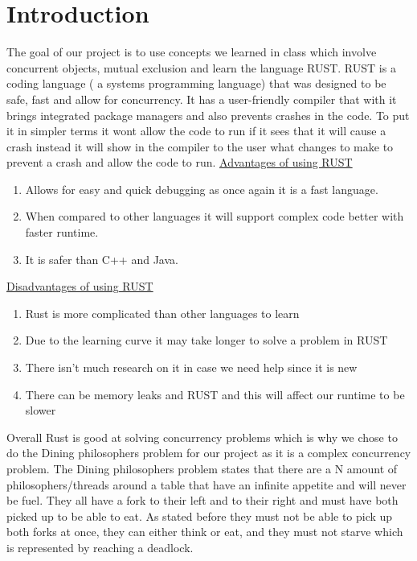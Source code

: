 \documentclass[conference]{IEEEtran}
\begin{document}
	\section{Introduction}
	 The goal of our project is to use concepts we learned in class which involve concurrent objects, mutual exclusion and learn the language RUST. RUST is a coding language ( a systems programming language) that was designed to be safe, fast and allow for concurrency.  It has a user-friendly compiler that with it brings integrated package managers and also prevents crashes in the code. To put it in simpler terms it wont allow the code to run if it sees that it will cause a crash instead it will show in the compiler to the user what changes to make to prevent a crash and allow the code to run. 
	 \linebreak
	 \underline{Advantages of using RUST}
	 \begin{enumerate}
	 	\item Allows for easy and quick debugging as once again it is a fast language.
	 	\item When compared to other languages it will support complex code better with faster runtime.
	 	\item It is safer than C++ and Java.
	 \end{enumerate}
	 \underline{Disadvantages of using RUST}
	 \begin{enumerate}
	 	\item Rust is more complicated than other languages to learn
	 	\item Due to the learning curve it may take longer to solve a problem in RUST
	 	\item There isn’t much research on it in case we need help since it is new
	 	\item There can be memory leaks and RUST and this will affect our runtime to be slower
	\end{enumerate}
	 Overall Rust is good at solving concurrency problems which is why we chose to do the Dining philosophers problem for our project as it is a complex concurrency problem. The Dining philosophers problem states that there are a N amount of philosophers/threads around a table that have an infinite appetite and will never be fuel. They all have a fork to their left and to their right and must have both picked up to be able to eat. As stated before they must not be able to pick up both forks at once, they can either think or eat, and they must not starve which is represented by reaching a deadlock.
	 \linebreak
\end{document}
